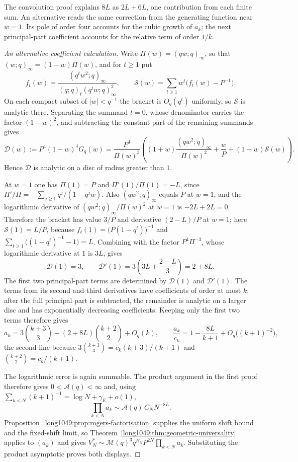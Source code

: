 The convolution proof explains $8L$ as $2L+6L$, one contribution
from each finite sum. An alternative reads the same correction from
the generating function near $w=1$. Its pole of order four accounts
for the cubic growth of $a_k$; the next principal-part coefficient
accounts for the relative term of order $1/k$.
\begin{proof}[An alternative coefficient calculation]
Write $\Pi(w)=(qw;q)_\infty$, so that $(w;q)_\infty=(1-w)\Pi(w)$, and for
$t\ge1$ put
\[
 f_t(w)=\frac{(q^tw^2;q)_\infty}{(q;q)_t(q^tw;q)_\infty^2},
 \qquad
 \mathcal S(w)=\sum_{t\ge1}w^t\bigl(f_t(w)-P^{-1}\bigr).
\]
On each compact subset of $|w|<q^{-1}$ the bracket is $O_q(q^t)$ uniformly, so
$\mathcal S$ is analytic there. Separating the summand $t=0$, whose
denominator carries the factor $(1-w)^2$, and subtracting the constant part of
the remaining summands gives
\[
 \mathcal D(w):=P^4(1-w)^4G_q(w)
 =\frac{P^4}{\Pi(w)^3}
 \left((1+w)\frac{(qw^2;q)_\infty}{\Pi(w)^2}+\frac wP
       +(1-w)\mathcal S(w)\right).
\]
Hence $\mathcal D$ is analytic on a disc of radius greater than $1$.

At $w=1$ one has $\Pi(1)=P$ and $\Pi'(1)/\Pi(1)=-L$, since
$\Pi'/\Pi=-\sum_{j\ge1}q^j/(1-q^jw)$. Also $(qw^2;q)_\infty$ equals $P$ at
$w=1$, and the logarithmic derivative of $(qw^2;q)_\infty/\Pi(w)^2$ at $w=1$ is
$-2L+2L=0$. Therefore the bracket has value $3/P$ and derivative $(2-L)/P$
at $w=1$; here $\mathcal S(1)=L/P$, because
$f_t(1)=\bigl(P(1-q^t)\bigr)^{-1}$ and
$\sum_{t\ge1}\bigl((1-q^t)^{-1}-1\bigr)=L$. Combining with the factor
$P^4\Pi^{-3}$, whose logarithmic derivative at $1$ is $3L$, gives
\[
 \mathcal D(1)=3,\qquad
 \mathcal D'(1)=3\left(3L+\frac{2-L}3\right)=2+8L.
\]
The first two principal-part terms are determined by $\mathcal D(1)$
and $\mathcal D'(1)$. The terms from its second and third derivatives
have coefficients of order at most $k$; after the full principal part
is subtracted, the remainder is analytic on a larger disc and has
exponentially decreasing coefficients. Keeping only the first two
terms therefore gives
\[
 a_k=3\binom{k+3}3-(2+8L)\binom{k+2}2+O_q(k),
 \qquad
 \frac{a_k}{c_k}=1-\frac{8L}{k+1}+O_q\bigl((k+1)^{-2}\bigr),
\]
the second line because $3\binom{k+3}3=c_k(k+3)/(k+1)$ and
$\binom{k+2}2=c_k/(k+1)$.

The logarithmic error is again summable. The product argument in
the first proof therefore gives $0<\mathcal A(q)<\infty$ and,
using $\sum_{k<N}(k+1)^{-1}=\log N+\gamma_{\!E}+o(1)$,
\[
 \prod_{k<N}a_k\sim\mathcal A(q)\,C_NN^{-8L}.
\]
Proposition~\ref{long1049:prop:rogers-factorisation} supplies the uniform shift
bound and the fixed-shift limit, so
Theorem~\ref{long1049:thm:geometric-universality} applies to $(a_k)$ and gives
$V_N^*\sim\mathcal M(q)^3q^{B_N}P^{2N}\prod_{k<N}a_k$. Substituting the product
asymptotic proves both displays.

\end{proof}

